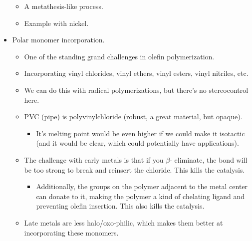 \documentclass[../notes.tex]{subfiles}
\begin{document}
\begin{itemize}
\begin{itemize}
        \item A metathesis-like process.
        \item Example with nickel.
    \end{itemize}
    \item Polar monomer incorporation.
    \begin{itemize}
        \item One of the standing grand challenges in olefin polymerization.
        \item Incorporating vinyl chlorides, vinyl ethers, vinyl esters, vinyl nitriles, etc.
        \item We can do this with radical polymerizations, but there's no stereocontrol here.
        \item PVC (pipe) is polyvinylchloride (robust, a great material, but opaque).
        \begin{itemize}
            \item It's melting point would be even higher if we could make it isotactic (and it would be clear, which could potentially have applications).
        \end{itemize}
        \item The challenge with early metals is that if you $\beta$- eliminate, the  bond will be too strong to break and reinsert the chloride. This kills the catalysis.
        \begin{itemize}
            \item Additionally, the groups on the polymer adjacent to the metal center can donate to it, making the polymer a kind of chelating ligand and preventing olefin insertion. This also kills the catalysis.
        \end{itemize}
        \item Late metals are less halo/oxo-philic, which makes them better at incorporating these monomers.
    \end{itemize}
\end{itemize}
\end{document}
